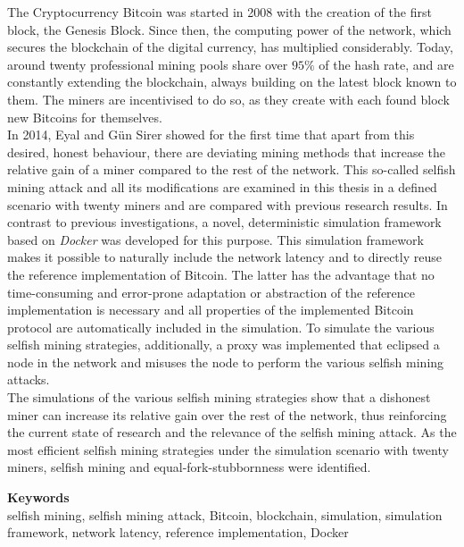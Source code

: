 The Cryptocurrency Bitcoin was started in 2008 with the creation of the first block, the Genesis Block. 
Since then, the computing power of the network, which secures the blockchain of the digital currency, has multiplied considerably.
Today, around twenty professional mining pools share over $ 95\% $ of the hash rate, and are constantly extending the blockchain, always building on the latest block known to them.
The miners are incentivised to do so, as they create with each
found block new Bitcoins for themselves.\\
In 2014, Eyal and Gün Sirer showed for the first time that apart from this desired, honest behaviour, there are deviating mining methods that increase the relative gain of a miner compared to the rest of the network.
This so-called selfish mining attack and all its modifications are examined in this thesis in a defined scenario with twenty miners and are compared with previous research results.
In contrast to previous investigations, a novel, deterministic simulation framework based on \textit{Docker} was developed for this purpose.
This simulation framework makes it possible to naturally include the network latency and to directly reuse the reference implementation of Bitcoin.
The latter has the advantage that no time-consuming and error-prone adaptation or abstraction of the reference implementation is necessary and all properties of the implemented Bitcoin protocol are automatically included in the simulation.
To simulate the various selfish mining strategies, additionally, a proxy was implemented that eclipsed a node in the network and misuses the node to perform the various selfish mining attacks.\\
The simulations of the various selfish mining strategies show that a dishonest miner can increase its relative gain over the rest of the network, thus reinforcing the current state of research and the relevance of the selfish mining attack.
As the most efficient selfish mining strategies under the simulation scenario with twenty miners, selfish mining and equal-fork-stubbornness were identified.

\bigskip
\noindent \textbf{Keywords}\\
selfish mining, selfish mining attack, Bitcoin, blockchain, simulation, simulation framework, network latency, reference implementation, Docker
